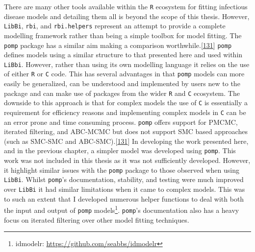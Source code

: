 \documentclass[11pt,twoside]{bristolthesis}
\begin{document}
  There are many other tools available within the \texttt{R} ecosystem for fitting infectious disease models and detailing them all is beyond the scope of this thesis. However, \texttt{LibBi}, \texttt{rbi}, and \texttt{rbi.helpers} represent an attempt to provide a complete modelling framework rather than being a simple toolbox for model fitting. The \texttt{pomp} package has a similar aim making a comparison worthwhile.{[}\protect\hyperlink{ref-King2016}{131}{]} \texttt{pomp} defines models using a similar structure to that presented here and used within \texttt{LiBbi}. However, rather than using its own modelling language it relies on the use of either \texttt{R} or \texttt{C} code. This has several advantages in that \texttt{pomp} models can more easily be generalized, can be understood and implemented by users new to the package and can make use of packages from the wider \texttt{R} and \texttt{C} ecosystem. The downside to this approach is that for complex models the use of \texttt{C} is essentially a requirement for efficiency reasons and implementing complex models in \texttt{C} can be an error prone and time consuming process. \texttt{pomp} offers support for PMCMC, iterated filtering, and ABC-MCMC but does not support SMC based approaches (such as SMC-SMC and ABC-SMC).{[}\protect\hyperlink{ref-King2016}{131}{]} In developing the work presented here, and in the previous chapter, a simpler model was developed using \texttt{pomp}. This work was not included in this thesis as it was not sufficiently developed. However, it highlight similar issues with the \texttt{pomp} package to those observed when using \texttt{LibBi}. Whilst \texttt{pomp}'s documentation, stability, and testing were much improved over \texttt{LibBi} it had similar limitations when it came to complex models. This was to such an extent that I developed numerous helper functions to deal with both the input and output of \texttt{pomp} models\footnote{idmodelr: \url{https://github.com/seabbs/idmodelr}}. \texttt{pomp}'s documentation also has a heavy focus on iterated filtering over other model fitting techniques.
  
\end{document}
